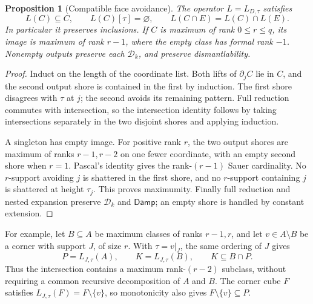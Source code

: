 \documentclass[11pt]{article}
\newtheorem{proposition}{Proposition}[section]
\theoremstyle{definition}
\newcommand{\Damp}{\mathsf{Damp}}
\begin{document}
\begin{proposition}[Compatible face avoidance]
\label{prop:monotone-predecessors}
The operator $L=L_{D,\tau}$ satisfies
\[
 L(C)\subseteq C,\qquad L(C)[\tau]=\varnothing,
 \qquad L(C\cap E)=L(C)\cap L(E).
\]
In particular it preserves inclusions. If $C$ is maximum of rank
$0\le r\le q$, its image is maximum of rank $r-1$, where the empty
class has formal rank $-1$. Nonempty outputs preserve each
$\mathcal D_k$, and preserve dismantlability.
\end{proposition}
\begin{proof}
Induct on the length of the coordinate list. Both lifts of
$\partial_jC$ lie in $C$, and the second output shore is contained in
the first by induction. The first shore disagrees with $\tau$ at $j$;
the second avoids its remaining pattern. Full reduction commutes with
intersection, so the intersection identity follows by taking intersections
separately in the two disjoint shores and applying induction.

A singleton has empty image. For positive rank $r$, the two output
shores are maximum of ranks $r-1,r-2$ on one fewer coordinate, with
an empty second shore when $r=1$. Pascal's identity gives the
rank-$(r-1)$ Sauer cardinality. No $r$-support avoiding $j$ is
shattered in the first shore, and no $r$-support containing $j$ is
shattered at height $\tau_j$. This proves maximumity. Finally full
reduction and nested expansion preserve $\mathcal D_k$ and
$\Damp$; an empty shore is handled by constant extension.
\end{proof}

For example, let $B\subseteq A$ be maximum classes of ranks $r-1,r$,
and let $v\in A\setminus B$ be a corner with support $J$, of size $r$.
With $\tau=v|_J$, the same ordering of $J$ gives
\[
 P=L_{J,\tau}(A),\qquad K=L_{J,\tau}(B),
 \qquad K\subseteq B\cap P.
\]
Thus the intersection contains a maximum rank-$(r-2)$ subclass,
without requiring a common recursive decomposition of $A$ and $B$.
The corner cube $F$ satisfies $L_{J,\tau}(F)=F\setminus\{v\}$,
so monotonicity also gives $F\setminus\{v\}\subseteq P$.
\end{document}
